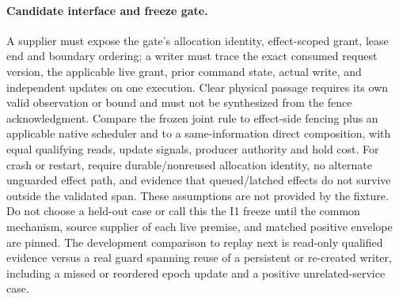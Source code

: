 \documentclass{article}
\begin{document}
\paragraph{Candidate interface and freeze gate.}
A supplier must expose the gate's allocation identity, effect-scoped grant, lease end and boundary ordering; a writer must trace the exact consumed request version, the applicable live grant, prior command state, actual write, and independent updates on one execution. Clear physical passage requires its own valid observation or bound and must not be synthesized from the fence acknowledgment. Compare the frozen joint rule to effect-side fencing plus an applicable native scheduler and to a same-information direct composition, with equal qualifying reads, update signals, producer authority and hold cost. For crash or restart, require durable/nonreused allocation identity, no alternate unguarded effect path, and evidence that queued/latched effects do not survive outside the validated span. These assumptions are not provided by the fixture. Do not choose a held-out case or call this the I1 freeze until the common mechanism, source supplier of each live premise, and matched positive envelope are pinned. The development comparison to replay next is read-only qualified evidence versus a real guard spanning reuse of a persistent or re-created writer, including a missed or reordered epoch update and a positive unrelated-service case.
\end{document}
